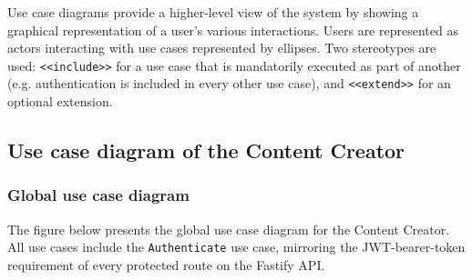 Use case diagrams provide a higher-level view of the system by showing a graphical
representation of a user's various interactions. Users are represented as actors interacting
with use cases represented by ellipses. Two stereotypes are used: \texttt{<<include>>} for a
use case that is mandatorily executed as part of another (e.g. authentication is included in
every other use case), and \texttt{<<extend>>} for an optional extension.

\subsection{Use case diagram of the Content Creator}
\label{sec:uc_creator}

\subsubsection{Global use case diagram}
\label{sec:uc_creator_global}

The figure below presents the global use case diagram for the Content Creator. All use cases
include the \texttt{Authenticate} use case, mirroring the JWT-bearer-token requirement of
every protected route on the Fastify API.

